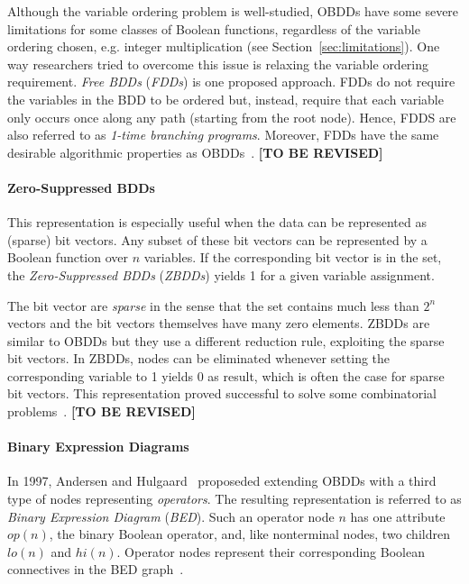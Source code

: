 \documentclass{vldb}
\newcommand{\tbr}{\textbf{[TO BE REVISED]}}
\begin{document}
Although the variable ordering problem is well-studied, OBDDs have some severe
limitations for some classes of Boolean functions, regardless of the variable
ordering chosen, e.g. integer multiplication (see Section~\ref{sec:limitations}).
One way researchers tried to overcome this issue is relaxing the variable ordering
requirement. \textit{Free BDDs} (\textit{FDDs}) is one proposed approach. FDDs
do not require the variables in the BDD to be ordered but, instead, require that
each variable only occurs once along any path (starting from the root node).
Hence, FDDS are also referred to as \textit{1-time branching programs}. Moreover,
FDDs have the same desirable algorithmic properties as OBDDs~\cite{BRYANT95}. \tbr

\paragraph*{Zero-Suppressed BDDs}
\mbox{} %

This representation is especially useful when the data can be represented as
(sparse) bit vectors. Any subset of these bit vectors can be represented by a
Boolean function over $n$ variables. If the corresponding bit vector is in the
set, the \textit{Zero-Suppressed BDDs} (\textit{ZBDDs}) yields 1 for a given
variable assignment.

The bit vector are \textit{sparse} in the sense that the set contains much less
than $2^n$ vectors and the bit vectors themselves have many zero elements. ZBDDs
are similar to OBDDs but they use a different reduction rule, exploiting the
sparse bit vectors. In ZBDDs, nodes can be eliminated whenever setting the
corresponding variable to 1 yields 0 as result, which is often the case for sparse
bit vectors. This representation proved successful to solve some combinatorial
problems~\cite{BRYANT95}. \tbr \newpage

\paragraph*{Binary Expression Diagrams}
\mbox{} %

In 1997, Andersen and Hulgaard~\cite{ANDERSEN97} proposeded extending OBDDs with
a third type of nodes representing \textit{operators}. The resulting
representation is referred to as \textit{Binary Expression Diagram}
(\textit{BED}). Such an operator node $n$ has one attribute $op(n)$, the binary
Boolean operator, and, like nonterminal nodes, two children $lo(n)$ and $hi(n)$.
Operator nodes represent their corresponding Boolean connectives in the BED
graph~\cite{ANDERSEN97}.
\end{document}
